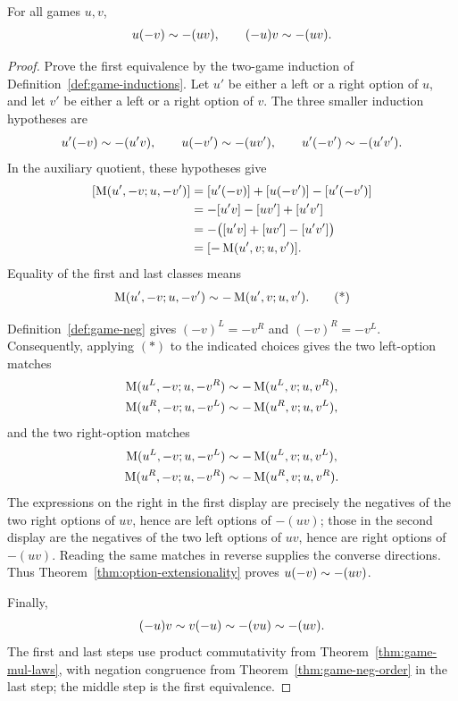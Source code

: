 \begin{lemma}
  \label{lem:game-mul-neg}
  \leanok
  For all games \(u,v\),
  \[
    u(-v)\sim-(uv),
    \qquad
    (-u)v\sim-(uv).
  \]
\end{lemma}
\begin{proof}
  \leanok
  Prove the first equivalence by the two-game induction of
  Definition~\ref{def:game-inductions}.  Let \(u'\) be either a left or a
  right option of \(u\), and let \(v'\) be either a left or a right option of
  \(v\).  The three smaller induction hypotheses are
  \[
    u'(-v)\sim-(u'v),\qquad
    u(-v')\sim-(uv'),\qquad
    u'(-v')\sim-(u'v').
  \]
  In the auxiliary quotient, these hypotheses give
  \[
    \begin{aligned}
      [\mulopt(u',-v;u,-v')]
        &=[u'(-v)]+[u(-v')]-[u'(-v')]\\
        &=-[u'v]-[uv']+[u'v']\\
        &=-\bigl([u'v]+[uv']-[u'v']\bigr)\\
        &=[-\mulopt(u',v;u,v')].
    \end{aligned}
  \]
  Equality of the first and last classes means
  \[
    \operatorname{M}(u',-v;u,-v')
      \sim-\operatorname{M}(u',v;u,v').
    \tag{*}
  \]

  Definition~\ref{def:game-neg} gives
  \(({-v})^L=-v^R\) and \(({-v})^R=-v^L\).  Consequently, applying \((*)\)
  to the indicated choices gives the two left-option matches
  \[
    \begin{aligned}
      \operatorname{M}(u^L,-v;u,-v^R)
        &\sim-\operatorname{M}(u^L,v;u,v^R),\\
      \operatorname{M}(u^R,-v;u,-v^L)
        &\sim-\operatorname{M}(u^R,v;u,v^L),
    \end{aligned}
  \]
  and the two right-option matches
  \[
    \begin{aligned}
      \operatorname{M}(u^L,-v;u,-v^L)
        &\sim-\operatorname{M}(u^L,v;u,v^L),\\
      \operatorname{M}(u^R,-v;u,-v^R)
        &\sim-\operatorname{M}(u^R,v;u,v^R).
    \end{aligned}
  \]
  The expressions on the right in the first display are precisely the
  negatives of the two right options of \(uv\), hence are left options of
  \(-(uv)\); those in the second display are the negatives of the two left
  options of \(uv\), hence are right options of \(-(uv)\).  Reading the same
  matches in reverse supplies the converse directions.  Thus
  Theorem~\ref{thm:option-extensionality} proves
  \(u(-v)\sim-(uv)\).

  Finally,
  \[
    (-u)v
      \sim v(-u)
      \sim-(vu)
      \sim-(uv).
  \]
  The first and last steps use product commutativity from
  Theorem~\ref{thm:game-mul-laws}, with negation congruence from
  Theorem~\ref{thm:game-neg-order} in the last step; the middle step is the
  first equivalence.
\end{proof}

